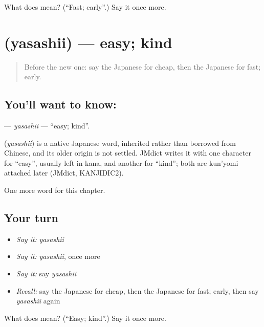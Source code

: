 \begin{tcolorbox}[breakable,colback=teal!4,colframe=teal!35!black,title={Before you move on}]
What does  mean? (\textquotedblleft{}Fast; early\textquotedblright{}.) Say it once more.
\end{tcolorbox}
\section[\texorpdfstring{\ja{やさしい} (yasashii)}{やさしい (yasashii)}]{ (yasashii) — easy; kind}

\label{lesson:JA-C49-yasashii}



\begin{quote}
Before the new one: say the Japanese for cheap, then the Japanese for fast; early.
\end{quote}

\subsection*{You'll want to know: }
\textbf{} — \emph{yasashii} — \textquotedblleft{}easy; kind\textquotedblright{}.

\begin{cousinweb}
\textbf{} (\emph{yasashii}) is a native Japanese word, inherited rather than borrowed from Chinese, and its older origin is not settled. JMdict writes it with one character for \textquotedblleft{}easy\textquotedblright{}, usually left in kana, and another for \textquotedblleft{}kind\textquotedblright{}; both are kun'yomi attached later (JMdict, KANJIDIC2).
\end{cousinweb}

\begin{grammarlens}[title={What you've built}]
One more word for this chapter.
\end{grammarlens}

\subsection*{Your turn}
\begin{itemize}
\raggedright
  \item \emph{Say it:} \emph{yasashii}
  \item \emph{Say it:} \emph{yasashii}, once more
  \item \emph{Say it:} say \emph{yasashii}
  \item \emph{Recall:} say the Japanese for cheap, then the Japanese for fast; early, then say \emph{yasashii} again
\end{itemize}

\begin{tcolorbox}[breakable,colback=teal!4,colframe=teal!35!black,title={Before you move on}]
What does  mean? (\textquotedblleft{}Easy; kind\textquotedblright{}.) Say it once more.
\end{tcolorbox}
